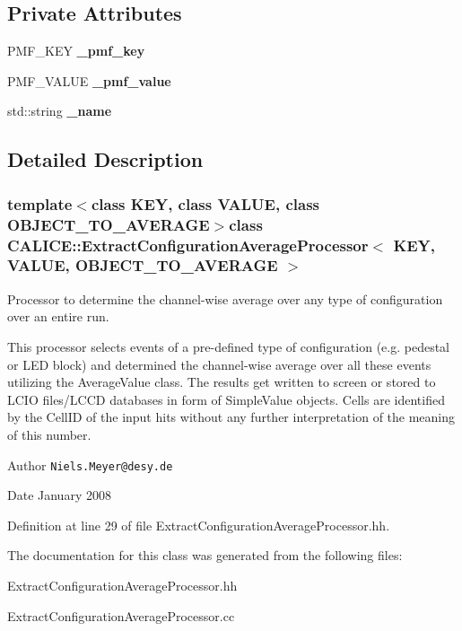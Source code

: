 \subsection*{Private Attributes}
\begin{DoxyCompactItemize}
\item 
P\-M\-F\-\_\-\-K\-E\-Y {\bfseries \-\_\-pmf\-\_\-key}\label{classCALICE_1_1ExtractConfigurationAverageProcessor_a8b33481b90291e374ba3386bc462f378}

\item 
P\-M\-F\-\_\-\-V\-A\-L\-U\-E {\bfseries \-\_\-pmf\-\_\-value}\label{classCALICE_1_1ExtractConfigurationAverageProcessor_a2b24536049c82fd0cbebaee159683451}

\item 
std\-::string {\bfseries \-\_\-name}\label{classCALICE_1_1ExtractConfigurationAverageProcessor_adc1336d4d2336e11746598d496e53f7e}

\end{DoxyCompactItemize}


\subsection{Detailed Description}
\subsubsection*{template$<$class K\-E\-Y, class V\-A\-L\-U\-E, class O\-B\-J\-E\-C\-T\-\_\-\-T\-O\-\_\-\-A\-V\-E\-R\-A\-G\-E$>$class C\-A\-L\-I\-C\-E\-::\-Extract\-Configuration\-Average\-Processor$<$ K\-E\-Y, V\-A\-L\-U\-E, O\-B\-J\-E\-C\-T\-\_\-\-T\-O\-\_\-\-A\-V\-E\-R\-A\-G\-E $>$}

Processor to determine the channel-\/wise average over any type of configuration over an entire run. 

This processor selects events of a pre-\/defined type of configuration (e.\-g. pedestal or L\-E\-D block) and determined the channel-\/wise average over all these events utilizing the Average\-Value class. The results get written to screen or stored to L\-C\-I\-O files/\-L\-C\-C\-D databases in form of Simple\-Value objects. Cells are identified by the Cell\-I\-D of the input hits without any further interpretation of the meaning of this number.

\begin{DoxyAuthor}{Author}
{\tt Niels.\-Meyer@desy.\-de} 
\end{DoxyAuthor}
\begin{DoxyDate}{Date}
January 2008 
\end{DoxyDate}


Definition at line 29 of file Extract\-Configuration\-Average\-Processor.\-hh.



The documentation for this class was generated from the following files\-:\begin{DoxyCompactItemize}
\item 
Extract\-Configuration\-Average\-Processor.\-hh\item 
Extract\-Configuration\-Average\-Processor.\-cc\end{DoxyCompactItemize}
